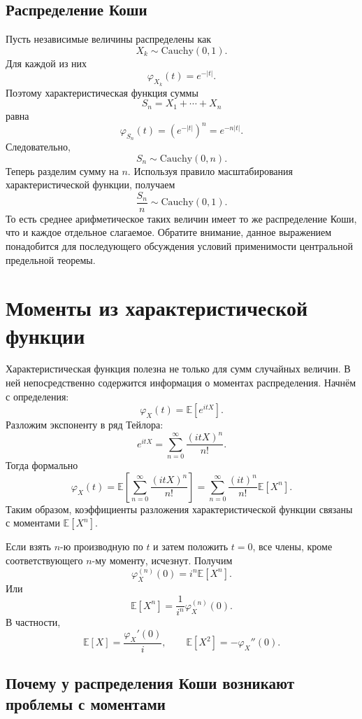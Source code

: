 \documentclass[
  russian,
  12pt,
  a4paper,
  a4paper,
  openany]{scrbook}
\begin{document}
\subsection{Распределение
Коши}\label{ux440ux430ux441ux43fux440ux435ux434ux435ux43bux435ux43dux438ux435-ux43aux43eux448ux438}

Пусть независимые величины распределены как
\[X_k\sim\mathrm{Cauchy}(0,1).\] Для каждой из них
\[\varphi_{X_k}(t)=e^{-|t|}.\] Поэтому характеристическая функция суммы
\[S_n=X_1+\cdots+X_n\] равна \[\varphi_{S_n}(t)
=
\left(e^{-|t|}\right)^n
=
e^{-n|t|}.\] Следовательно, \[S_n\sim\mathrm{Cauchy}(0,n).\] Теперь
разделим сумму на \(n\). Используя правило масштабирования
характеристической функции, получаем \[\boxed{
\frac{S_n}{n}
\sim
\mathrm{Cauchy}(0,1).
}\] То есть среднее арифметическое таких величин имеет то же
распределение Коши, что и каждое отдельное слагаемое. Обратите внимание,
данное выражением понадобится для последующего обсуждения условий
применимости центральной предельной теоремы.

\section{Моменты из характеристической
функции}\label{ux43cux43eux43cux435ux43dux442ux44b-ux438ux437-ux445ux430ux440ux430ux43aux442ux435ux440ux438ux441ux442ux438ux447ux435ux441ux43aux43eux439-ux444ux443ux43dux43aux446ux438ux438}

Характеристическая функция полезна не только для сумм случайных величин.
В ней непосредственно содержится информация о моментах распределения.
Начнём с определения: \[\varphi_X(t)
=
\mathbb{E}\!\left[e^{itX}\right].\] Разложим экспоненту в ряд Тейлора:
\[e^{itX}
=
\sum_{n=0}^{\infty}
\frac{(itX)^n}{n!}.\] Тогда формально \[\varphi_X(t)=
\mathbb{E}\!\left[\sum_{n=0}^{\infty}\frac{(itX)^n}{n!}\right]=\sum_{n=0}^{\infty}\frac{(it)^n}{n!}\mathbb{E}[X^n].\]
Таким образом, коэффициенты разложения характеристической функции
связаны с моментами \(\mathbb{E}[X^n]\).

Если взять \(n\)-ю производную по \(t\) и затем положить \(t=0\), все
члены, кроме соответствующего \(n\)-му моменту, исчезнут. Получим
\[\boxed{
\varphi_X^{(n)}(0)
=
i^n\mathbb{E}[X^n].
}\] Или \[\boxed{
\mathbb{E}[X^n]
=
\frac{1}{i^n}\varphi_X^{(n)}(0).
}\] В частности, \[\mathbb{E}[X]
=
\frac{\varphi_X'(0)}{i},
\qquad
\mathbb{E}[X^2]
=
-\varphi_X''(0).\]

\subsection{Почему у распределения Коши возникают проблемы с
моментами}\label{ux43fux43eux447ux435ux43cux443-ux443-ux440ux430ux441ux43fux440ux435ux434ux435ux43bux435ux43dux438ux44f-ux43aux43eux448ux438-ux432ux43eux437ux43dux438ux43aux430ux44eux442-ux43fux440ux43eux431ux43bux435ux43cux44b-ux441-ux43cux43eux43cux435ux43dux442ux430ux43cux438}
\end{document}
